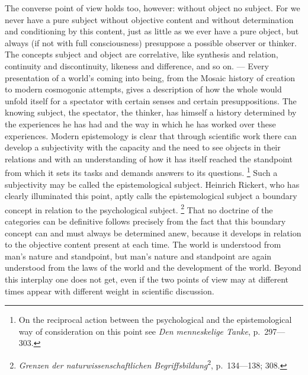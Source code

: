 \documentclass[12pt]{article}
\newcommand{\opage}[1]{\marginnote{\footnotesize\textit{[#1]}}}
\begin{document}
The converse point of view holds too, however: without object no subject.
For we never have a pure subject without objective content and without
determination and conditioning by this content, just as little as we ever
have a pure object, but always (if not with full consciousness) presuppose a
possible observer or thinker. The concepts subject and object are
correlative, like synthesis and relation, continuity and discontinuity,
likeness and difference, and so on. --- Every presentation of a world's
coming into being, from the Mosaic history of creation to modern cosmogonic
\opage{61}attempts, gives a description of how the whole would unfold itself for a
spectator with certain senses and certain presuppositions. The knowing
subject, the spectator, the thinker, has himself a history determined by the
experiences he has had and the way in which he has worked over these
experiences. Modern epistemology is clear that through scientific work there
can develop a subjectivity with the capacity and the need to see objects in
their relations and with an understanding of how it has itself reached the
standpoint from which it sets its tasks and demands answers to its
questions.%
\footnote{On the reciprocal action between the psychological and the
epistemological way of consideration on this point see \textit{Den
menneskelige Tanke}, p.~297---303.}
Such a subjectivity may be called the epistemological subject. Heinrich
Rickert, who has clearly illuminated this point, aptly calls the
epistemological subject a boundary concept in relation to the psychological
subject.%
\footnote{\textit{Grenzen der naturwissenschaftlichen
Begriffsbildung}\textsuperscript{2}, p.~134---138; 308.}
That no doctrine of the categories can be definitive follows precisely from
the fact that this boundary concept can and must always be determined anew,
because it develops in relation to the objective content present at each
time. The world is understood from man's nature and standpoint, but man's
nature and standpoint are again understood from the laws of the world and
the development of the world. Beyond this interplay one does not get, even
if the two points of view may at different times appear with different
weight in scientific discussion.
\end{document}
